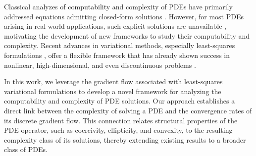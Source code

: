 \documentclass[pdflatex]{sn-jnl}%
\begin{document}

Classical analyzes of computability and complexity of PDEs have primarily addressed equations admitting closed-form solutions \cite{Pour-El1997-br, Weihrauch2006-cp, bacho2023complexityblowupsolutionslaplace}. However, for most PDEs arising in real-world applications, such explicit solutions are unavailable \cite{Evans2022-ig, Trefethen2000-su}, motivating the development of new frameworks to study their computability and complexity. Recent advances in variational methods, especially least-squares formulations \cite{Los2023-jo, Cai2020-js}, offer a flexible framework that has already shown success in nonlinear, high-dimensional, and even discontinuous problems \cite{Hu2024-sy, Cardona2023-ma, Suarez2025}.

In this work, we leverage the gradient flow associated with least-squares variational formulations \cite{Ghoussoub2004-ou, Ambrosio2008-qd} to develop a novel framework for analyzing the computability and complexity of PDE solutions. Our approach establishes a direct link between the complexity of solving a PDE and the convergence rates of its discrete gradient flow. This connection relates structural properties of the PDE operator, such as coercivity, ellipticity, and convexity, to the resulting complexity class of its solutions, thereby extending existing results to a broader class of PDEs.
\end{document}
